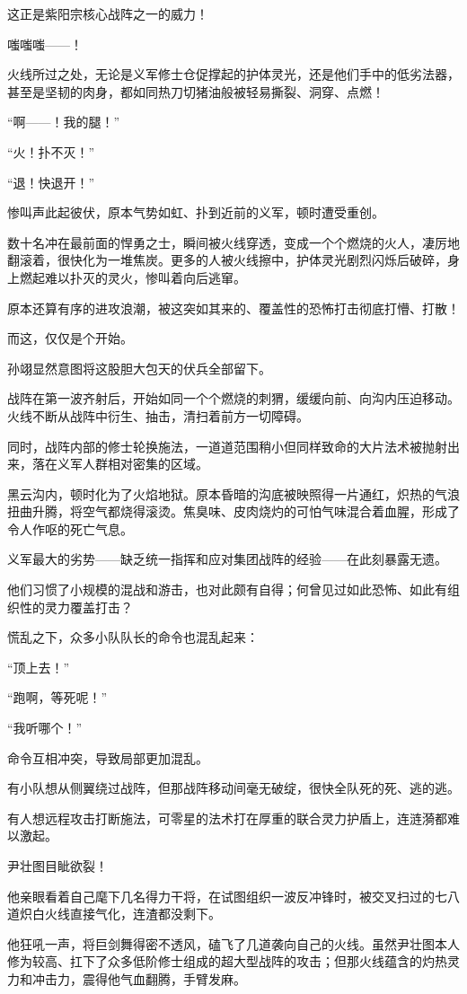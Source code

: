 这正是紫阳宗核心战阵之一的威力！

嗤嗤嗤——！

火线所过之处，无论是义军修士仓促撑起的护体灵光，还是他们手中的低劣法器，甚至是坚韧的肉身，都如同热刀切猪油般被轻易撕裂、洞穿、点燃！

“啊——！我的腿！”

“火！扑不灭！”

“退！快退开！”

惨叫声此起彼伏，原本气势如虹、扑到近前的义军，顿时遭受重创。

数十名冲在最前面的悍勇之士，瞬间被火线穿透，变成一个个燃烧的火人，凄厉地翻滚着，很快化为一堆焦炭。更多的人被火线擦中，护体灵光剧烈闪烁后破碎，身上燃起难以扑灭的灵火，惨叫着向后逃窜。

原本还算有序的进攻浪潮，被这突如其来的、覆盖性的恐怖打击彻底打懵、打散！

而这，仅仅是个开始。

孙翊显然意图将这股胆大包天的伏兵全部留下。

战阵在第一波齐射后，开始如同一个个燃烧的刺猬，缓缓向前、向沟内压迫移动。火线不断从战阵中衍生、抽击，清扫着前方一切障碍。

同时，战阵内部的修士轮换施法，一道道范围稍小但同样致命的大片法术被抛射出来，落在义军人群相对密集的区域。

黑云沟内，顿时化为了火焰地狱。原本昏暗的沟底被映照得一片通红，炽热的气浪扭曲升腾，将空气都烧得滚烫。焦臭味、皮肉烧灼的可怕气味混合着血腥，形成了令人作呕的死亡气息。

义军最大的劣势——缺乏统一指挥和应对集团战阵的经验——在此刻暴露无遗。

他们习惯了小规模的混战和游击，也对此颇有自得；何曾见过如此恐怖、如此有组织性的灵力覆盖打击？

慌乱之下，众多小队队长的命令也混乱起来：

“顶上去！”

“跑啊，等死呢！”

“我听哪个！”

命令互相冲突，导致局部更加混乱。

有小队想从侧翼绕过战阵，但那战阵移动间毫无破绽，很快全队死的死、逃的逃。

有人想远程攻击打断施法，可零星的法术打在厚重的联合灵力护盾上，连涟漪都难以激起。

尹壮图目眦欲裂！

他亲眼看着自己麾下几名得力干将，在试图组织一波反冲锋时，被交叉扫过的七八道炽白火线直接气化，连渣都没剩下。

他狂吼一声，将巨剑舞得密不透风，磕飞了几道袭向自己的火线。虽然尹壮图本人修为较高、扛下了众多低阶修士组成的超大型战阵的攻击；但那火线蕴含的灼热灵力和冲击力，震得他气血翻腾，手臂发麻。

